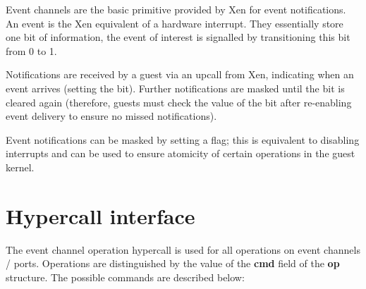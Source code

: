 \documentclass[11pt,twoside,final,openright]{report}
\newcommand{\hypercall}[1]{\vspace{2mm}{\sf #1}}
\begin{document}
Event channels are the basic primitive provided by Xen for event
notifications.  An event is the Xen equivalent of a hardware
interrupt.  They essentially store one bit of information, the event
of interest is signalled by transitioning this bit from 0 to 1.

Notifications are received by a guest via an upcall from Xen,
indicating when an event arrives (setting the bit).  Further
notifications are masked until the bit is cleared again (therefore,
guests must check the value of the bit after re-enabling event
delivery to ensure no missed notifications).

Event notifications can be masked by setting a flag; this is
equivalent to disabling interrupts and can be used to ensure atomicity
of certain operations in the guest kernel.

\section{Hypercall interface}

\hypercall{event\_channel\_op(evtchn\_op\_t *op)}

The event channel operation hypercall is used for all operations on
event channels / ports.  Operations are distinguished by the value of
the {\bf cmd} field of the {\bf op} structure.  The possible commands
are described below:
\end{document}
